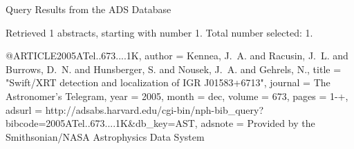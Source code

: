 Query Results from the ADS Database


Retrieved 1 abstracts, starting with number 1.  Total number selected: 1.

@ARTICLE{2005ATel..673....1K,
   author = {{Kennea}, J.~A. and {Racusin}, J.~L. and {Burrows}, D.~N. and 
	{Hunsberger}, S. and {Nousek}, J.~A. and {Gehrels}, N.},
    title = "{Swift/XRT detection and localization of IGR J01583+6713}",
  journal = {The Astronomer's Telegram},
     year = 2005,
    month = dec,
   volume = 673,
    pages = {1-+},
   adsurl = {http://adsabs.harvard.edu/cgi-bin/nph-bib_query?bibcode=2005ATel..673....1K&db_key=AST},
  adsnote = {Provided by the Smithsonian/NASA Astrophysics Data System}
}



